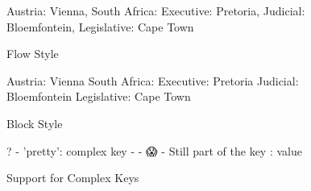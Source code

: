 \begin{figure}[H]
  \begin{minipage}[t]{0.48\textwidth}
    \vspace{0pt}
    \begin{bchart}[max=9, width=0.85\textwidth]
    \end{bchart}
  \end{minipage}
  \begin{minipage}[t]{0.48\textwidth}
    \vspace{0pt}
    \begin{yamlcode}
      { Austria: Vienna,
        South Africa: {
          Executive: Pretoria,
          Judicial: Bloemfontein,
          Legislative: Cape Town }
      }
    \end{yamlcode}
  \end{minipage}
  \caption{Flow Style}
\end{figure}

\begin{figure}[H]
  \begin{minipage}[t]{0.48\textwidth}
    \vspace{0pt}
    \begin{bchart}[max=9, width=0.85\textwidth]
    \end{bchart}
  \end{minipage}
  \begin{minipage}[t]{0.48\textwidth}
    \vspace{0pt}
    \begin{yamlcode}
      Austria: Vienna
      South Africa:
        Executive:   Pretoria
        Judicial:    Bloemfontein
        Legislative: Cape Town
    \end{yamlcode}
  \end{minipage}
  \caption{Block Style}
\end{figure}

\begin{figure}[H]
  \begin{minipage}[t]{0.48\textwidth}
    \vspace{0pt}
    \begin{bchart}[max=9, width=0.85\textwidth]
    \end{bchart}
  \end{minipage}
  \begin{minipage}[t]{0.48\textwidth}
    \vspace{0pt}
    \begin{yamlcode}
      ?
      - { 'pretty': complex key }
      - - 😱
      - Still part of the key
      : value
    \end{yamlcode}
  \end{minipage}
  \caption{Support for Complex Keys}
\end{figure}

